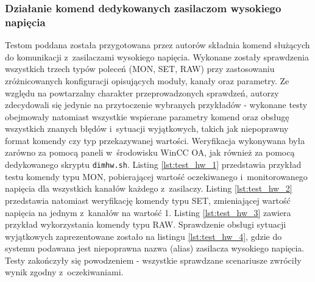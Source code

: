 \subsubsection*{Działanie komend dedykowanych zasilaczom wysokiego napięcia}
Testom poddana została przygotowana przez autorów składnia komend służących do komunikacji z~zasilaczami wysokiego napięcia. Wykonane zostały sprawdzenia wszystkich trzech typów poleceń (MON, SET, RAW) przy zastosowaniu zróżnicowanych konfiguracji opisujących moduły, kanały oraz parametry. Ze względu na powtarzalny charakter przeprowadzonych sprawdzeń, autorzy zdecydowali się jedynie na przytoczenie wybranych przykładów - wykonane testy obejmowały natomiast wszystkie wspierane parametry komend oraz obsługę wszystkich znanych błędów i~sytuacji wyjątkowych, takich jak niepoprawny format komendy czy typ przekazywanej wartości. Weryfikacja wykonywana była zarówno za pomocą paneli w~środowisku WinCC OA, jak również za pomocą dedykowanego skryptu \lstinline{dimhw.sh}. Listing \ref{lst:test_hw_1} przedstawia przykład testu komendy typu MON, pobierającej wartość oczekiwanego i~monitorowanego napięcia dla wszystkich kanałów każdego z~zasilaczy. Listing \ref{lst:test_hw_2} przedstawia natomiast weryfikację komendy typu SET, zmieniającej wartość napięcia na jednym z~kanałów na wartość 1. Listing \ref{lst:test_hw_3} zawiera przykład wykorzystania komendy typu RAW. Sprawdzenie obsługi sytuacji wyjątkowych zaprezentowane zostało na listingu \ref{lst:test_hw_4}, gdzie do systemu podawana jest niepoprawna nazwa (alias) zasilacza wysokiego napięcia. Testy zakończyły się powodzeniem - wszystkie sprawdzane scenariusze zwróciły wynik zgodny z~oczekiwaniami.







